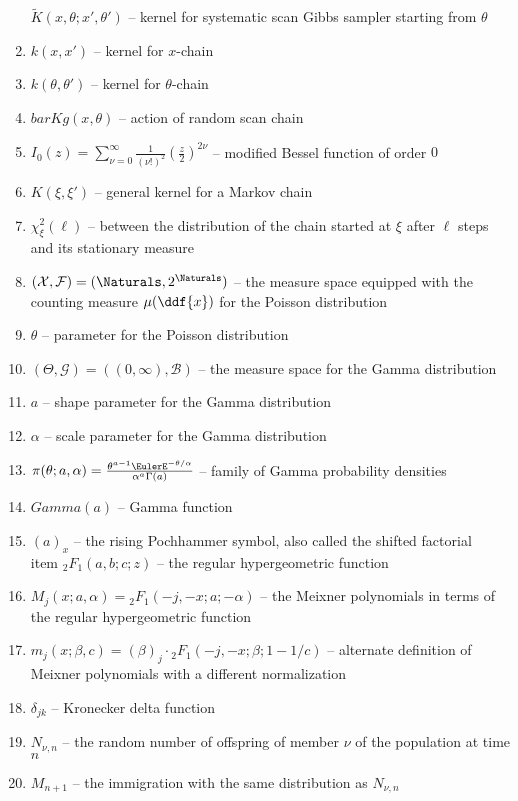 \documentclass[12pt]{article}
\begin{document}
\begin{enumerate}
        \( \tilde{K}(x, \theta ; x' , \theta') \) -- kernel for
        systematic scan Gibbs sampler starting from \( \theta \)
    \item
        \( k(x,x') \) -- kernel for \( x \)-chain
    \item
        \( k(\theta,\theta') \) -- kernel for \( \theta \)-chain
    \item
        \( bar{K} g(x,\theta) \) -- action of random scan chain
    \item
        \( I_0(z) = \sum\limits_{\nu=0}^{\infty} \frac{1}{(\nu !)^2}\left
        ( \frac {z}{2} \right)^{2\nu} \) -- modified Bessel function of
        order \( 0 \)
    \item
        \( K(\xi, \xi') \) -- general kernel for a Markov chain
    \item
        \( \chi^2_{\xi}(\ell) \) --  between
        the distribution of the chain started at \( \xi \) after \( \ell
        \) steps and its stationary measure

    \item
        \( (\mathcal{X}, \mathcal{F}) = (\Naturals, 2^{\Naturals}) \) --
        the measure space equipped with the counting measure \( \mu(\ddf
        {x}) \) for the Poisson distribution
    \item
        \( \theta \) -- parameter for the Poisson distribution
    \item
        \( (\Theta, \mathcal{G}) = ((0,\infty), \mathcal{B}) \) -- the
        measure space for the Gamma distribution
    \item
        \( a \) -- shape parameter for the Gamma distribution
    \item
        \( \alpha \) -- scale parameter for the Gamma distribution
    \item
        \( \pi(\theta; a, \alpha) = \frac{ \theta^{a-1} \EulerE^{-\theta/\alpha}}
        {\alpha^a \Gamma(a)} \) -- family of Gamma probability densities
    \item
        \( Gamma(a) \) -- Gamma function
    \item
        \( (a)_x \) -- the rising Pochhammer symbol, also called the
        shifted factorial \\
        item \( {}_2F_1(a,b; c; z) \) -- the regular hypergeometric
        function
    \item
        \( M_j(x; a, \alpha) = {}_2F_1 \left( -j, -x; a; -\alpha \right)
        \) -- the Meixner polynomials in terms of the regular
        hypergeometric function
    \item
        \( m_j(x; \beta, c) = (\beta)_j \cdot {}_2F_1 \left( -j, -x;
        \beta; 1 - 1/c \right) \) -- alternate definition of Meixner
        polynomials with a different normalization
    \item
        \( \delta_{jk} \) -- Kronecker delta function
    \item
        \( N_{\nu,n} \) -- the random number of offspring of member \(
        \nu \) of the population at time \( n \)
    \item
        \( M_{n+1} \) -- the immigration with the same distribution as \(
        N_{\nu, n} \)
\end{enumerate}
\end{document}
